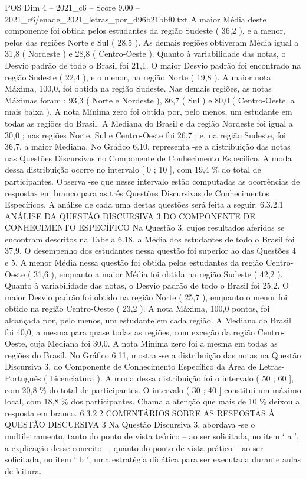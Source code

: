 \begin{textsample}{POS Dim 4 – 2021\_c6 – Score 9.00 – 2021\_c6/enade\_2021\_letras\_por\_d96b21bbf0.txt}
A maior Média deste componente foi obtida pelos estudantes da região Sudeste ( 36,2 ), e a menor, pelos das regiões Norte e Sul ( 28,5 ).
As demais regiões obtiveram Média igual a 31,8 ( Nordeste ) e 28,8 ( Centro-Oeste ).
Quanto à variabilidade das notas, o Desvio padrão de todo o Brasil foi 21,1.
O maior Desvio padrão foi encontrado na região Sudeste ( 22,4 ), e o menor, na região Norte ( 19,8 ).
A maior nota Máxima, 100,0, foi obtida na região Sudeste.
Nas demais regiões, as notas Máximas foram : 93,3 ( Norte e Nordeste ), 86,7 ( Sul ) e 80,0 ( Centro-Oeste, a mais baixa ).
A nota Mínima zero foi obtida por, pelo menos, um estudante em todas as regiões do Brasil.
A Mediana do Brasil e da região Nordeste foi igual a 30,0 ; nas regiões Norte, Sul e Centro-Oeste foi 26,7 ; e, na região Sudeste, foi 36,7, a maior Mediana.
No Gráfico 6.10, representa -se a distribuição das notas nas Questões Discursivas no Componente de Conhecimento Específico.
A moda dessa distribuição ocorre no intervalo [ 0 ; 10 ], com 19,4 \% do total de participantes.
Observa -se que nesse intervalo estão computadas as ocorrências de respostas em branco para as três Questões Discursivas de Conhecimentos Específicos.
A análise de cada uma destas questões será feita a seguir. 6.3.2.1 ANÁLISE DA QUESTÃO DISCURSIVA 3 DO COMPONENTE DE CONHECIMENTO ESPECÍFICO Na Questão 3, cujos resultados aferidos se encontram descritos na Tabela 6.18, a Média dos estudantes de todo o Brasil foi 37,9.
O desempenho dos estudantes nessa questão foi superior ao das Questões 4 e 5.
A menor Média nessa questão foi obtida pelos estudantes da região Centro-Oeste ( 31,6 ), enquanto a maior Média foi obtida na região Sudeste ( 42,2 ).
Quanto à variabilidade das notas, o Desvio padrão de todo o Brasil foi 25,2.
O maior Desvio padrão foi obtido na região Norte ( 25,7 ), enquanto o menor foi obtido na região Centro-Oeste ( 23,2 ).
A nota Máxima, 100,0 pontos, foi alcançada por, pelo menos, um estudante em cada região.
A Mediana do Brasil foi 40,0, a mesma para quase todas as regiões, com exceção da região Centro-Oeste, cuja Mediana foi 30,0.
A nota Mínima zero foi a mesma em todas as regiões do Brasil.
No Gráfico 6.11, mostra -se a distribuição das notas na Questão Discursiva 3, do Componente de Conhecimento Específico da Área de Letras-Português ( Licenciatura ).
A moda dessa distribuição foi o intervalo ( 50 ; 60 ], com 20,8 \% do total de participantes.
O intervalo ( 30 ; 40 ] constitui um máximo local, com 18,8 \% dos participantes.
Chama a atenção que mais de 10 \% deixou a resposta em branco. 6.3.2.2 COMENTÁRIOS SOBRE AS RESPOSTAS À QUESTÃO DISCURSIVA 3 Na Questão Discursiva 3, abordava -se o multiletramento, tanto do ponto de vista teórico – ao ser solicitada, no item ‘ a ’, a explicação desse conceito –, quanto do ponto de vista prático – ao ser solicitada, no item ‘ b ’, uma estratégia didática para ser executada durante aulas de leitura.

\end{textsample}
